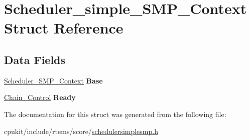 \hypertarget{structScheduler__simple__SMP__Context}{}\section{Scheduler\+\_\+simple\+\_\+\+S\+M\+P\+\_\+\+Context Struct Reference}
\label{structScheduler__simple__SMP__Context}
\subsection*{Data Fields}
\begin{DoxyCompactItemize}
\item 
\mbox{\label{structScheduler__simple__SMP__Context_ada56fe4a7eeff78717faa7b80bd2258b}} 
\mbox{\hyperlink{structScheduler__SMP__Context}{Scheduler\+\_\+\+S\+M\+P\+\_\+\+Context}} {\bfseries Base}
\item 
\mbox{\label{structScheduler__simple__SMP__Context_a613f518544927a02840138e2df55e4d0}} 
\mbox{\hyperlink{unionChain__Control}{Chain\+\_\+\+Control}} {\bfseries Ready}
\end{DoxyCompactItemize}


The documentation for this struct was generated from the following file\+:\begin{DoxyCompactItemize}
\item 
cpukit/include/rtems/score/\mbox{\hyperlink{schedulersimplesmp_8h}{schedulersimplesmp.\+h}}\end{DoxyCompactItemize}
